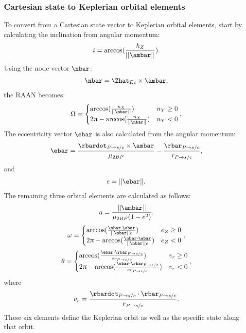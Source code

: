 \subsubsection{Cartesian state to Keplerian orbital elements}
To convert from a Cartesian state vector to Keplerian orbital elements, start by calculating the
inclination from angular momentum:
\begin{equation}
    i=\arccos(\frac{h_{Z}}{||\ambar||}).
    \label{eq:inclination}
\end{equation}
Using the node vector $\nbar$:
\begin{equation}
    \nbar=\Zhat_{Ec}\times\ambar,
    \label{eq:nodes}
\end{equation}
the RAAN becomes:
\begin{equation}
    \Omega=\begin{cases}\arccos(\frac{n_{X}}{||\nbar||})&n_{Y}\geq0\cr2\pi-\arccos(\frac{n_{X}}{||\nbar||})&n_{Y}<0\end{cases}.
    \label{RAAN}
\end{equation}
The eccentricity vector $\ebar$ is also calculated from the angular momentum:
\begin{equation}
    \ebar=\frac{\rbardot_{P\rightarrow s/c}\times\ambar}{\mu_{2BP}}-\frac{\rbar_{P\rightarrow s/c}}{r_{P\rightarrow s/c}},
    \label{eq:eccentricityvector}
\end{equation}
and
\begin{equation}
    e=||\ebar||.
    \label{eq:eccentricity}
\end{equation}
The remaining three orbital elements are calculated as follows:
\begin{equation}
    a=\frac{||\ambar||}{\mu_{2BP}(1-e^{2})},
    \label{eq:semimajoraxis}
\end{equation}
\begin{equation}
    \omega=\begin{cases}\arccos(\frac{\nbar\cdot\ebar}{||\nbar||e})&e_{Z}\geq0\cr2\pi-\arccos(\frac{\nbar\cdot\ebar}{||\nbar||e})&e_{Z}<0\end{cases},
    \label{eq:argumentofperiapsis}
\end{equation}
\begin{equation}
    \theta=\begin{cases}\arccos(\frac{\ebar\cdot\rbar_{P\rightarrow s/c}}{er_{P\rightarrow s/c}})&v_{r}\geq0\cr2\pi-\arccos(\frac{\ebar\cdot\rbar_{P\rightarrow s/c}}{er_{P\rightarrow s/c}})&v_{r}<0\end{cases},
    \label{eq:trueanomaly}
\end{equation}
where
\begin{equation}
    v_{r}=\frac{\rbardot_{P\rightarrow s/c}\cdot\rbar_{P\rightarrow s/c}}{r_{P\rightarrow s/c}}.
    \label{eq:radialvelocity}
\end{equation}
These six elements define the Keplerian orbit as well as the specific state along that orbit.


